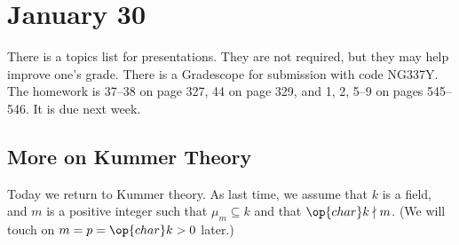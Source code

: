 \documentclass[../notes.tex]{subfiles}
\begin{document}
\section{January 30}

There is a topics list for presentations. They are not required, but they may help improve one's grade. There is a Gradescope for submission with code NG337Y. The homework is 37--38 on page 327, 44 on page 329, and 1, 2, 5--9 on pages 545--546. It is due next week.

\subsection{More on Kummer Theory}
Today we return to Kummer theory. As last time, we assume that $k$ is a field, and $m$ is a positive integer such that $\mu_m\subseteq k$ and that $\op{char}k\nmid m$. (We will touch on $m=p=\op{char}k>0$ later.)
\end{document}

